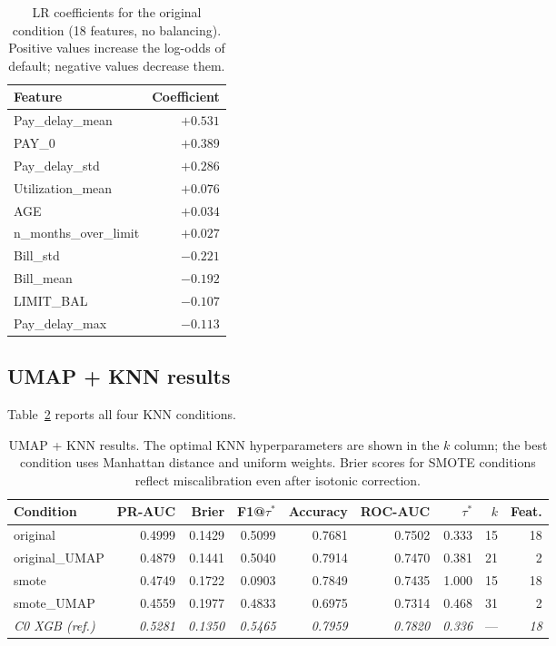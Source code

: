 \documentclass[12pt,a4paper]{article}
\begin{document}
\begin{table}[H]
\centering
\caption{LR coefficients for the original condition (18 features, no
         balancing). Positive values increase the log-odds of default;
         negative values decrease them.}
\label{tab:lr_coefs}
\small
\begin{tabular}{lr}
\toprule
Feature & Coefficient \\
\midrule
Pay\_delay\_mean   & $+0.531$ \\
PAY\_0             & $+0.389$ \\
Pay\_delay\_std    & $+0.286$ \\
Utilization\_mean  & $+0.076$ \\
AGE                & $+0.034$ \\
n\_months\_over\_limit & $+0.027$ \\
\midrule
Bill\_std          & $-0.221$ \\
Bill\_mean         & $-0.192$ \\
LIMIT\_BAL         & $-0.107$ \\
Pay\_delay\_max    & $-0.113$ \\
\bottomrule
\end{tabular}
\end{table}

\subsection{UMAP + KNN results}

Table~\ref{tab:knn_results} reports all four KNN conditions.

\begin{table}[H]
\centering
\caption{UMAP + KNN results. The optimal KNN hyperparameters are shown in the
         $k$ column; the best condition uses Manhattan distance and uniform
         weights. Brier scores for SMOTE conditions reflect miscalibration
         even after isotonic correction.}
\label{tab:knn_results}
\small
\begin{tabular}{lrrrrrrrr}
\toprule
Condition & PR-AUC & Brier & F1@$\tau^*$ & Accuracy & ROC-AUC & $\tau^*$ & $k$ & Feat. \\
\midrule
original      & 0.4999 & 0.1429 & 0.5099 & 0.7681 & 0.7502 & 0.333 & 15 & 18 \\
original\_UMAP & 0.4879 & 0.1441 & 0.5040 & 0.7914 & 0.7470 & 0.381 & 21 & 2 \\
smote         & 0.4749 & 0.1722 & 0.0903 & 0.7849 & 0.7435 & 1.000 & 15 & 18 \\
smote\_UMAP   & 0.4559 & 0.1977 & 0.4833 & 0.6975 & 0.7314 & 0.468 & 31 & 2 \\
\midrule
\textit{C0 XGB (ref.)} & \textit{0.5281} & \textit{0.1350} & \textit{0.5465} & \textit{0.7959} & \textit{0.7820} & \textit{0.336} & — & \textit{18} \\
\bottomrule
\end{tabular}
\end{table}
\end{document}
